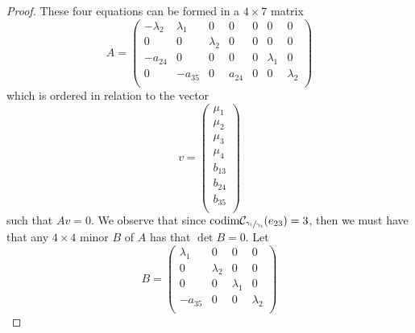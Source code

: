 \documentclass[12pt]{article}
\begin{document}
\begin{proof}
These four equations can be formed in a $4\times 7$ matrix \[
A=\begin{pmatrix}
-\lambda_2 & \lambda_1 & 0 & 0 & 0 & 0 & 0\\
0 & 0 & \lambda_2 & 0 & 0 & 0 & 0\\
-a_{24} & 0 & 0 & 0 & 0 & \lambda_1 & 0\\
0 & -a_{35} & 0 & a_{24} & 0 & 0 & \lambda_2\\
\end{pmatrix}
\]
which is ordered in relation to the vector \[
v=\begin{pmatrix}
\mu_1\\
\mu_2\\
\mu_3\\
\mu_4\\
b_{13}\\
b_{24}\\
b_{35}\\
\end{pmatrix}
\]
such that $Av=0$. We observe that since $\mathrm{codim}\mathcal{C}_{\sfrac{\gamma_1}{\gamma_4}}(e_{23})=3$, then we must have that any $4\times 4$ minor $B$ of $A$ has that $\det B=0$. Let \[B=\begin{pmatrix}
\lambda_1 & 0 & 0 & 0\\
0 & \lambda_2 & 0 & 0\\
0 & 0 & \lambda_1 & 0\\
-a_{35} & 0 & 0 & \lambda_2\\
\end{pmatrix}\]

\end{proof}
\end{document}
